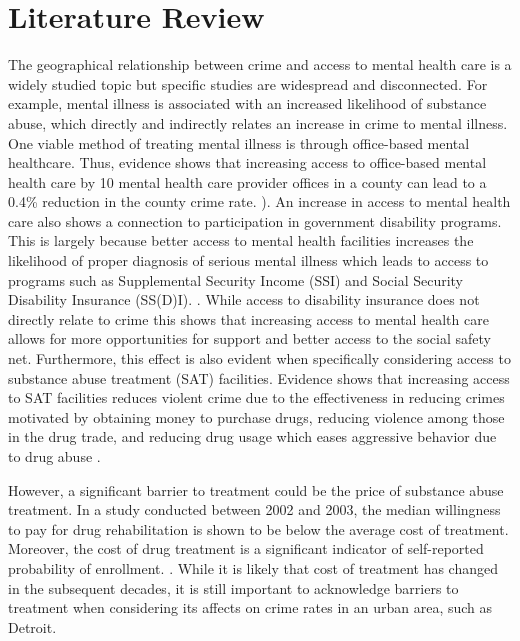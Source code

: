 \documentclass[12pt]{article}
\begin{document}
\section{Literature Review} \label{sec:literature}
The geographical relationship between crime and access to mental health care is a widely studied topic but specific studies are widespread and disconnected. For example, mental illness is associated with an increased likelihood of substance abuse, which directly and indirectly relates an increase in crime to mental illness. One viable method of treating mental illness is through office-based mental healthcare. Thus, evidence shows that increasing access to office-based mental health care by 10 mental health care provider offices in a county can lead to a 0.4\% reduction in the county crime rate. \cite{mental_healthcare_and_crime}). An increase in access to mental health care also shows a connection to participation in government disability programs. This is largely because better access to mental health facilities increases the likelihood of proper diagnosis of serious mental illness which leads to access to programs such as Supplemental Security Income (SSI) and Social Security Disability Insurance (SS(D)I). \cite{mental_health_and_disability}. While access to disability insurance does not directly relate to crime this shows that increasing access to mental health care allows for more opportunities for support and better access to the social safety net. Furthermore, this effect is also evident when specifically considering access to substance abuse treatment (SAT) facilities. Evidence shows that increasing access to SAT facilities reduces violent crime due to the effectiveness in reducing crimes motivated by obtaining money to purchase drugs, reducing violence among those in the drug trade, and reducing drug usage which eases aggressive behavior due to drug abuse \cite{SAT_centers_and_crime}. 

However, a significant barrier to treatment could be the price of substance abuse treatment. In a study conducted between 2002 and 2003, the median willingness to pay for drug rehabilitation is shown to be below the average cost of treatment. Moreover, the cost of drug treatment is a significant indicator of self-reported probability of enrollment. \cite{cost_of_drug_treatment}. While it is likely that cost of treatment has changed in the subsequent decades, it is still important to acknowledge barriers to treatment when considering its affects on crime rates in an urban area, such as Detroit. 
\end{document}
